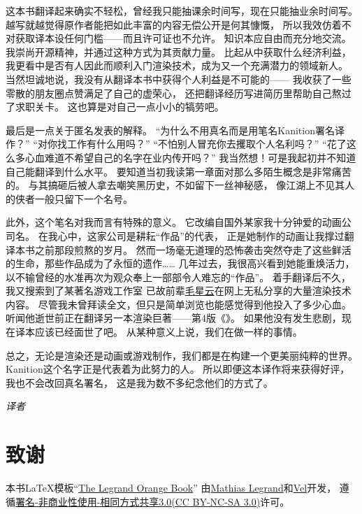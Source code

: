 这本书翻译起来确实不轻松，曾经我只能抽课余时间写，现在只能抽业余时间写。
越写就越觉得原作者能把如此丰富的内容无偿公开是何其慷慨，
所以我效仿着不对获取译本设任何门槛——而且许可证也不允许。
知识本应自由而充分地交流。我崇尚开源精神，并通过这种方式为其贡献力量。
比起从中获取什么经济利益，我更看中是否有人因此而顺利入门渲染技术，成为又一个充满潜力的领域新人。
当然坦诚地说，我没有从翻译本书中获得个人利益是不可能的——
我收获了一些零散的朋友圈点赞满足了自己的虚荣心，
还把翻译经历写进简历里帮助自己熬过了求职关卡。
这也算是对自己一点小小的犒劳吧。

最后是一点关于匿名发表的解释。
“为什么不用真名而是用笔名Kanition署名译作？”
“对你找工作有什么用吗？”
“不怕别人冒充你去攫取个人名利吗？”
“花了这么多心血难道不希望自己的名字在业内传开吗？”
我当然想！可是我起初并不知道自己能翻译到什么水平。
要知道当初我读第一章面对那么多陌生概念是非常痛苦的。
与其搞砸后被人拿去嘲笑黑历史，不如留下一丝神秘感，
像江湖上不见其人的侠者一般只留下一个名号。

此外，这个笔名对我而言有特殊的意义。
它改编自国外某家我十分钟爱的动画公司名。
在我心中，这家公司是耕耘“作品”的代表，
正是她制作的动画让我撑过翻译本书之前那段煎熬的岁月。
然而一场毫无道理的恐怖袭击突然夺走了这些鲜活的生命，那些作品成为了永恒的遗作……
几年过去，我很高兴看到她能重焕活力，以不输曾经的水准再次为观众奉上一部部令人难忘的“作品”。
着手翻译后不久，我又搜索到了某著名游戏工作室
已故前辈\href{https://github.com/QianMo}{毛星云}在网上无私分享的大量渲染技术内容。
尽管我未曾拜读全文，但只是简单浏览也能感觉得到他投入了多少心血。
听闻他逝世前正在翻译另一本渲染巨著——第4版《》。
如果他没有发生悲剧，现在译本应该已经面世了吧。
从某种意义上说，我们在做一样的事情。

总之，无论是渲染还是动画或游戏制作，我们都是在构建一个更美丽纯粹的世界。
Kanition这个名字正是代表着为此努力的人。
所以即便这本译作将来获得好评，我也不会改回真名署名，
这是我为数不多纪念他们的方式了。

\vspace{15pt}
{\hfill {\itshape 译者}\quad{}\qquad}

\section*{致谢}\label{sec:致谢b}
本书\LaTeX 模板“\href{https://www.latextemplates.com/template/legrand-orange-book}{The Legrand Orange Book}”
由\href{mailto:legrand.mathias@gmail.com}{Mathias Legrand}和\href{mailto:vel@latextemplates.com}{Vel}开发，
遵循\href{https://creativecommons.org/licenses/by-nc-sa/3.0/}{署名-非商业性使用-相同方式共享3.0(CC BY-NC-SA 3.0)}许可。

